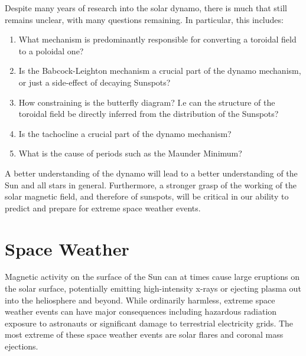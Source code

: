 \documentclass[11pt,a4paper,onecolumn]{report}
\begin{document}
Despite many years of research into the solar dynamo, there is much that still
remains unclear, with many questions remaining. In particular, this includes:
\begin{enumerate}
  \item What mechanism is predominantly responsible for converting a toroidal
  field to a poloidal one?

  \item Is the Babcock-Leighton mechanism a crucial part of the dynamo
  mechanism, or just a side-effect of decaying Sunspots?

  \item How constraining is the butterfly diagram? I.e can the structure of the toroidal field be
  directly inferred from the distribution of the Sunspots?

  \item Is the tachocline a crucial part of the dynamo mechanism?

  \item What is the cause of periods such as the Maunder Minimum?
\end{enumerate}
A better understanding of the dynamo will lead to a better understanding of the Sun
and all stars in general. Furthermore, a stronger grasp of the working of the
solar magnetic field, and therefore of sunspots, will be critical in our ability
to predict and prepare for extreme space weather events.








\section{Space Weather}



Magnetic activity on the surface of the Sun can at times cause large eruptions
on the solar surface, potentially emitting high-intensity x-rays or ejecting
plasma out into the heliosphere and beyond. While ordinarily harmless, extreme
space weather events can have major consequences including hazardous radiation exposure
to astronauts or significant damage to terrestrial electricity grids. The most extreme
of these space weather events are solar flares and coronal mass ejections. \\
\end{document}
